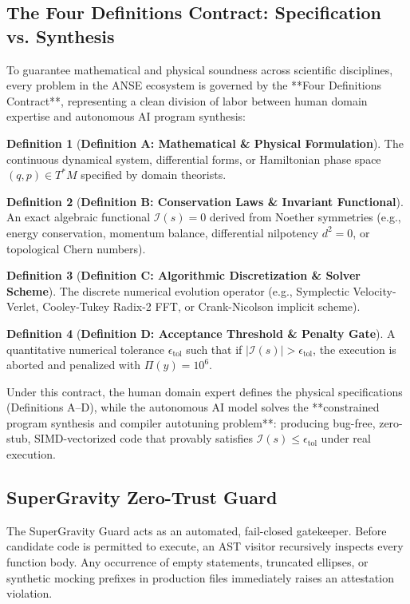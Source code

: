 \documentclass[10pt,journal,compsoc,twocolumn]{IEEEtran}
\theoremstyle{definition}
\newtheorem{definition}{Definition}
\begin{document}
\subsection{The Four Definitions Contract: Specification vs. Synthesis}
To guarantee mathematical and physical soundness across scientific disciplines, every problem in the ANSE ecosystem is governed by the **Four Definitions Contract**, representing a clean division of labor between human domain expertise and autonomous AI program synthesis:

\begin{definition}[\textbf{Definition A: Mathematical \& Physical Formulation}]
The continuous dynamical system, differential forms, or Hamiltonian phase space $(q, p) \in T^* M$ specified by domain theorists.
\end{definition}

\begin{definition}[\textbf{Definition B: Conservation Laws \& Invariant Functional}]
An exact algebraic functional $\mathcal{I}(s) = 0$ derived from Noether symmetries (e.g., energy conservation, momentum balance, differential nilpotency $d^2 = 0$, or topological Chern numbers).
\end{definition}

\begin{definition}[\textbf{Definition C: Algorithmic Discretization \& Solver Scheme}]
The discrete numerical evolution operator (e.g., Symplectic Velocity-Verlet, Cooley-Tukey Radix-2 FFT, or Crank-Nicolson implicit scheme).
\end{definition}

\begin{definition}[\textbf{Definition D: Acceptance Threshold \& Penalty Gate}]
A quantitative numerical tolerance $\epsilon_{\text{tol}}$ such that if $|\mathcal{I}(s)| > \epsilon_{\text{tol}}$, the execution is aborted and penalized with $\Pi(y) = 10^6$.
\end{definition}

Under this contract, the human domain expert defines the physical specifications (Definitions A–D), while the autonomous AI model solves the **constrained program synthesis and compiler autotuning problem**: producing bug-free, zero-stub, SIMD-vectorized code that provably satisfies $\mathcal{I}(s) \le \epsilon_{\text{tol}}$ under real execution.

\subsection{SuperGravity Zero-Trust Guard}
The SuperGravity Guard acts as an automated, fail-closed gatekeeper. Before candidate code is permitted to execute, an AST visitor recursively inspects every function body. Any occurrence of empty statements, truncated ellipses, or synthetic mocking prefixes in production files immediately raises an attestation violation.
\end{document}
